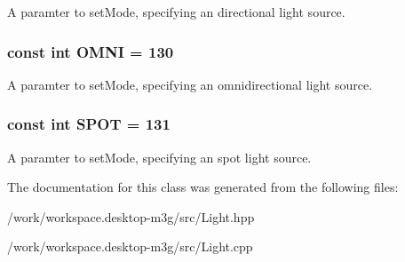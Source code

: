 A paramter to setMode, specifying an directional light source. \hypertarget{classm3g_1_1Light_34d360bb8395ad7fbcd3ec286ece64cb}{
\subsubsection[{OMNI}]{\setlength{\rightskip}{0pt plus 5cm}const int {\bf OMNI} = 130}}
\label{classm3g_1_1Light_34d360bb8395ad7fbcd3ec286ece64cb}


A paramter to setMode, specifying an omnidirectional light source. \hypertarget{classm3g_1_1Light_c44aef16b96dc8fd8b134416964a7de9}{
\subsubsection[{SPOT}]{\setlength{\rightskip}{0pt plus 5cm}const int {\bf SPOT} = 131}}
\label{classm3g_1_1Light_c44aef16b96dc8fd8b134416964a7de9}


A paramter to setMode, specifying an spot light source. 

The documentation for this class was generated from the following files:\begin{CompactItemize}
\item 
/work/workspace.desktop-m3g/src/Light.hpp\item 
/work/workspace.desktop-m3g/src/Light.cpp\end{CompactItemize}
